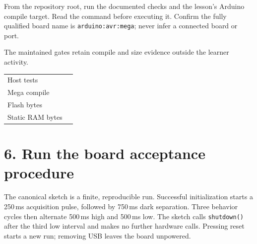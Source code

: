 \documentclass[11pt]{article}
\begin{document}
From the repository root, run the documented checks and the lesson's Arduino
compile target. Read the command before executing it. Confirm the fully
qualified board name is \texttt{arduino:avr:mega}; never infer a connected
board or port.


The maintained gates retain compile and size evidence outside the learner activity.

\begin{tabularx}{\linewidth}{@{}lX@{}}
Host tests & \rule{0pt}{0.7cm}\\
Mega compile & \rule{0pt}{0.7cm}\\
Flash bytes & \rule{0pt}{0.7cm}\\
Static RAM bytes & \rule{0pt}{0.7cm}\\
\end{tabularx}

\section*{6. Run the board acceptance procedure}

The canonical sketch is a finite, reproducible run. Successful initialization
starts a 250\,ms acquisition pulse, followed by 750\,ms dark separation. Three
behavior cycles then alternate 500\,ms high and 500\,ms low. The sketch calls
\texttt{shutdown()} after the third low interval and makes no further hardware
calls. Pressing reset starts a new run; removing USB leaves the board
unpowered.
\end{document}
